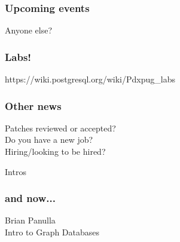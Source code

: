 \documentclass{beamer}
\begin{document}
\frame
{
  \frametitle{Upcoming events}
  \begin{center}
Anyone else?
  \end{center}
}

\frame
{
  \frametitle{Labs!}
  \begin{center}
https://wiki.postgresql.org/wiki/Pdxpug\_labs
  \end{center}
}

\frame
{
  \frametitle{Other news}
  \begin{center}
Patches reviewed or accepted?\\
Do you have a new job?\\
Hiring/looking to be hired?
  \end{center}
}

\frame
{
  \begin{center}
  {\huge Intros}
  \end{center}
}

\frame
{
  \frametitle{and now...}
  \begin{center}
{\huge Brian Panulla}\\
Intro to Graph Databases
  \end{center}
}
\end{document}
